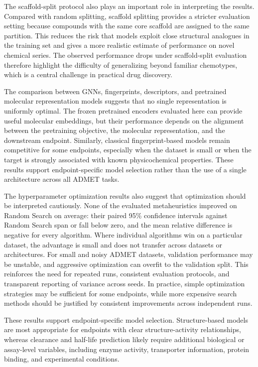 \documentclass[journal]{IEEEtran}
\begin{document}
The scaffold-split protocol also plays an important role in interpreting the results.
Compared with random splitting, scaffold splitting provides a stricter evaluation setting because compounds with the same core scaffold are assigned to the same partition.
This reduces the risk that models exploit close structural analogues in the training set and gives a more realistic estimate of performance on novel chemical series.
The observed performance drops under scaffold-split evaluation therefore highlight the difficulty of generalizing beyond familiar chemotypes, which is a central challenge in practical drug discovery.

The comparison between GNNs, fingerprints, descriptors, and pretrained molecular representation models suggests that no single representation is uniformly optimal.
The frozen pretrained encoders evaluated here can provide useful molecular embeddings, but their performance depends on the alignment between the pretraining objective, the molecular representation, and the downstream endpoint.
Similarly, classical fingerprint-based models remain competitive for some endpoints, especially when the dataset is small or when the target is strongly associated with known physicochemical properties.
These results support endpoint-specific model selection rather than the use of a single architecture across all ADMET tasks.

The hyperparameter optimization results also suggest that optimization should be interpreted cautiously.
None of the evaluated metaheuristics improved on Random Search on average: their paired 95\% confidence intervals against Random Search span or fall below zero, and the mean relative difference is negative for every algorithm.
Where individual algorithms win on a particular dataset, the advantage is small and does not transfer across datasets or architectures.
For small and noisy ADMET datasets, validation performance may be unstable, and aggressive optimization can overfit to the validation split.
This reinforces the need for repeated runs, consistent evaluation protocols, and transparent reporting of variance across seeds.
In practice, simple optimization strategies may be sufficient for some endpoints, while more expensive search methods should be justified by consistent improvements across independent runs.

These results support endpoint-specific model selection. Structure-based models are most appropriate for endpoints with clear structure-activity relationships, whereas clearance and half-life prediction likely require additional biological or assay-level variables, including enzyme activity, transporter information, protein binding, and experimental conditions.
\end{document}
